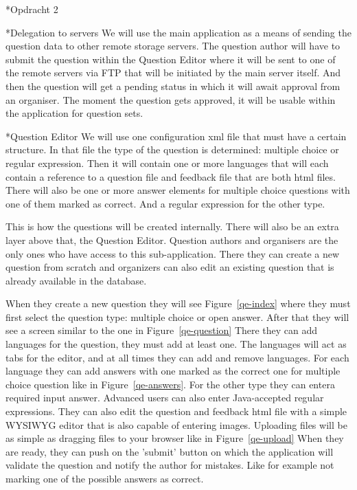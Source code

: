 \begin{section}*{Opdracht 2}
    \begin{subsection}*{Delegation to servers}
        We will use the main application as a means of sending the question data to other
        remote storage servers. The question author will have to submit the question within
        the Question Editor where it will be sent to one of the remote servers via FTP that
        will be initiated by the main server itself. And then the question will get a
        pending status in which it will await approval from an organiser. The moment
        the question gets approved, it will be usable within the application for question
        sets.
    \end{subsection}
    
    \begin{subsection}*{Question Editor}
        We will use one configuration xml file that must have a certain structure. In
        that file the type of the question is determined: multiple choice or regular
        expression. Then it will contain one or more languages that will each contain a
        reference to a question file and feedback file that are both html files. There
        will also be one or more answer elements for multiple choice questions with one
        of them marked as correct. And a regular expression for the other type.
        
        This is how the questions will be created internally. There will also be an extra
        layer above that, the Question Editor.
        Question authors and organisers are the only ones who have access to this
        sub-application. There they can create a new question from scratch and organizers
        can also edit an existing question that is already available in the database.
        
        When they create a new question they will see Figure~\ref{qe-index} where they
        must first select the question type:
        multiple choice or open answer. After that they will see a screen similar to the
        one in Figure~\ref{qe-question} There they can add languages for the question, they must add at
        least one. The languages will act as tabs for the editor, and at all times they
        can add and remove languages. For each language they can add answers with
        one marked as the correct one for multiple choice question like in Figure~\ref{qe-answers}.
        For the other type they can entera required input answer. Advanced users can also
        enter Java-accepted regular expressions. They can also edit the question and feedback html file
        with a simple WYSIWYG editor that is also capable of entering images. Uploading
        files will be as simple as dragging files to your browser like in Figure~\ref{qe-upload}
        When they are ready, they can push on the 'submit' button on which the application
        will validate the question and notify the author for mistakes. Like for example
        not marking one of the possible answers as correct.
        

\end{subsection}
\end{section}
